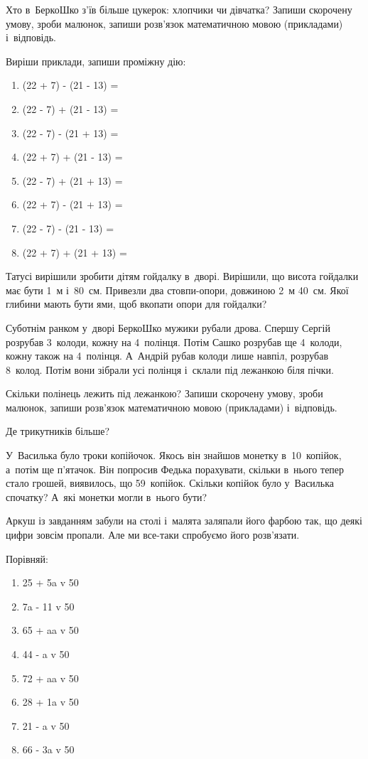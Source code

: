 Хто в~БеркоШко з’їв більше цукерок: хлопчики чи дівчатка?
Запиши скорочену умову, зроби малюнок, запиши розв’язок
математичною мовою (прикладами) і~відповідь.


\problem
Виріши приклади, запиши проміжну дію:
\begin{multicols}{2}
    \begin{enumerate}
        \item (22 + 7) - (21 - 13) = 
        \item (22 - 7) + (21 - 13) = 
        \item (22 - 7) - (21 + 13) = 
        \item (22 + 7) + (21 - 13) = 
        \item (22 - 7) + (21 + 13) = 
        \item (22 + 7) - (21 + 13) = 
        \item (22 - 7) - (21 - 13) = 
        \item (22 + 7) + (21 + 13) = 
    \end{enumerate}
\end{multicols}


\problem
Татусі вирішили зробити дітям гойдалку в~дворі.
Вирішили, що висота гойдалки має бути 1~м і~80~см.
Привезли два стовпи-опори, довжиною 2~м 40~см.
Якої глибини мають бути ями, щоб вкопати опори для гойдалки?


\problem
Суботнім ранком у~дворі БеркоШко мужики рубали дрова.
Спершу Сергій розрубав 3~колоди, кожну на 4~полінця.
Потім Сашко розрубав ще 4~колоди, кожну також на 4~полінця.
А~Андрій рубав колоди лише навпіл, розрубав 8~колод.
Потім вони зібрали усі полінця і~склали під лежанкою біля пічки.

Скільки полінець лежить під лежанкою?
Запиши скорочену умову, зроби малюнок,
запиши розв’язок математичною мовою (прикладами) і~відповідь.


\problem
Де трикутників більше?


\problem
У~Василька було троки копійочок.
Якось він знайшов монетку в~10~копійок, а~потім ще п’ятачок.
Він попросив Федька порахувати, скільки в~нього тепер стало грошей,
виявилось, що 59~копійок.
Скільки копійок було у~Василька спочатку?
А~які монетки могли в~нього бути? 


\problem
Аркуш із завданням забули на столі і~малята заляпали його фарбою так,
що деякі цифри зовсім пропали.
Але ми все-таки спробуємо його розв’язати.

Порівняй:
\begin{multicols}{2}
    \begin{enumerate}
        \item 25 + 5a v 50
        \item 7a - 11 v 50
        \item 65 + aa v 50
        \item 44 - a v 50
        \item 72 + aa v 50
        \item 28 + 1a v 50
        \item 21 - a v 50
        \item 66 - 3a v 50
    \end{enumerate}
\end{multicols}


